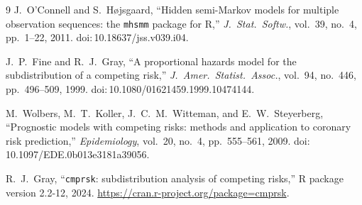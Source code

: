\documentclass[11pt]{article}
\begin{document}
\begin{thebibliography}{9}
J.~O'Connell and S.~H{\o}jsgaard, ``Hidden semi-Markov models for multiple observation sequences: the \texttt{mhsmm} package for R,'' \textit{J.\ Stat.\ Softw.}, vol.~39, no.~4, pp.~1--22, 2011. doi:\,10.18637/jss.v039.i04.

J.~P.~Fine and R.~J.~Gray, ``A proportional hazards model for the subdistribution of a competing risk,'' \textit{J.\ Amer.\ Statist.\ Assoc.}, vol.~94, no.~446, pp.~496--509, 1999. doi:\,10.1080/01621459.1999.10474144.

M.~Wolbers, M.~T.~Koller, J.~C.~M.~Witteman, and E.~W.~Steyerberg, ``Prognostic models with competing risks: methods and application to coronary risk prediction,'' \textit{Epidemiology}, vol.~20, no.~4, pp.~555--561, 2009. doi:\,10.1097/EDE.0b013e3181a39056.

R.~J.~Gray, ``\texttt{cmprsk}: subdistribution analysis of competing risks,'' R package version 2.2-12, 2024. \url{https://cran.r-project.org/package=cmprsk}.
\end{thebibliography}
\end{document}
